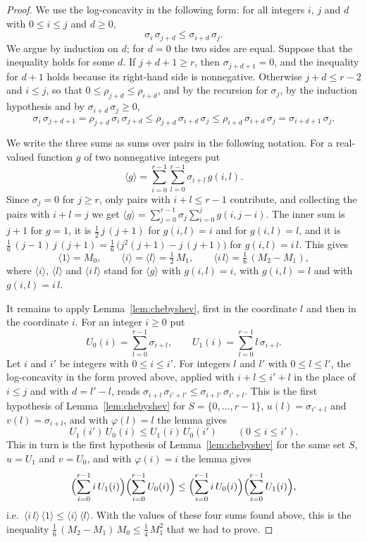 \documentclass{amsart}
\theoremstyle{definition}
\theoremstyle{remark}
\numberwithin{equation}{section}
\begin{document}
\begin{proof}
We use the log-concavity in the following form: for all integers $i$, $j$ and $d$ with $0\le i\le j$ and $d\ge 0$,
\[
\sigma_i\,\sigma_{j+d}\le\sigma_{i+d}\,\sigma_j.
\]
We argue by induction on $d$; for $d=0$ the two sides are equal. Suppose that the inequality holds for some $d$. If $j+d+1\ge r$, then $\sigma_{j+d+1}=0$, and the inequality for $d+1$ holds because its right-hand side is nonnegative. Otherwise $j+d\le r-2$ and $i\le j$, so that $0\le\rho_{j+d}\le\rho_{i+d}$, and by the recursion for $\sigma_j$, by the induction hypothesis and by $\sigma_{i+d}\,\sigma_j\ge 0$,
\[
\sigma_i\,\sigma_{j+d+1}=\rho_{j+d}\,\sigma_i\,\sigma_{j+d}\le\rho_{j+d}\,\sigma_{i+d}\,\sigma_j\le\rho_{i+d}\,\sigma_{i+d}\,\sigma_j=\sigma_{i+d+1}\,\sigma_j.
\]

We write the three sums as sums over pairs in the following notation. For a real-valued function $g$ of two nonnegative integers put
\[
\langle g\rangle=\sum_{i=0}^{r-1}\sum_{l=0}^{r-1}\sigma_{i+l}\,g(i,l).
\]
Since $\sigma_j=0$ for $j\ge r$, only pairs with $i+l\le r-1$ contribute, and collecting the pairs with $i+l=j$ we get $\langle g\rangle=\sum_{j=0}^{r-1}\sigma_j\sum_{i=0}^{j}g(i,j-i)$. The inner sum is $j+1$ for $g=1$, it is $\frac12\,j\,(j+1)$ for $g(i,l)=i$ and for $g(i,l)=l$, and it is $\frac16\,(j-1)\,j\,(j+1)=\frac16\,\bigl(j^2(j+1)-j\,(j+1)\bigr)$ for $g(i,l)=i\,l$. This gives
\[
\langle 1\rangle=M_0,\qquad\langle i\rangle=\langle l\rangle=\tfrac12\,M_1,\qquad\langle i\,l\rangle=\tfrac16\,(M_2-M_1),
\]
where $\langle i\rangle$, $\langle l\rangle$ and $\langle i\,l\rangle$ stand for $\langle g\rangle$ with $g(i,l)=i$, with $g(i,l)=l$ and with $g(i,l)=i\,l$.

It remains to apply Lemma~\ref{lem:chebyshev}, first in the coordinate $l$ and then in the coordinate $i$. For an integer $i\ge 0$ put
\[
U_0(i)=\sum_{l=0}^{r-1}\sigma_{i+l},\qquad U_1(i)=\sum_{l=0}^{r-1}l\,\sigma_{i+l}.
\]
Let $i$ and $i'$ be integers with $0\le i\le i'$. For integers $l$ and $l'$ with $0\le l\le l'$, the log-concavity in the form proved above, applied with $i+l\le i'+l$ in the place of $i\le j$ and with $d=l'-l$, reads $\sigma_{i+l}\,\sigma_{i'+l'}\le\sigma_{i+l'}\,\sigma_{i'+l}$. This is the first hypothesis of Lemma~\ref{lem:chebyshev} for $S=\{0,\dots,r-1\}$, $u(l)=\sigma_{i'+l}$ and $v(l)=\sigma_{i+l}$, and with $\varphi(l)=l$ the lemma gives
\[
U_1(i')\,U_0(i)\le U_1(i)\,U_0(i')\qquad(0\le i\le i').
\]
This in turn is the first hypothesis of Lemma~\ref{lem:chebyshev} for the same set $S$, $u=U_1$ and $v=U_0$, and with $\varphi(i)=i$ the lemma gives
\[
\Bigl(\sum_{i=0}^{r-1}i\,U_1(i)\Bigr)\Bigl(\sum_{i=0}^{r-1}U_0(i)\Bigr)\le\Bigl(\sum_{i=0}^{r-1}i\,U_0(i)\Bigr)\Bigl(\sum_{i=0}^{r-1}U_1(i)\Bigr),
\]
i.e.\ $\langle i\,l\rangle\,\langle 1\rangle\le\langle i\rangle\,\langle l\rangle$. With the values of these four sums found above, this is the inequality $\frac16\,(M_2-M_1)\,M_0\le\frac14\,M_1^2$ that we had to prove.


\end{proof}
\end{document}
